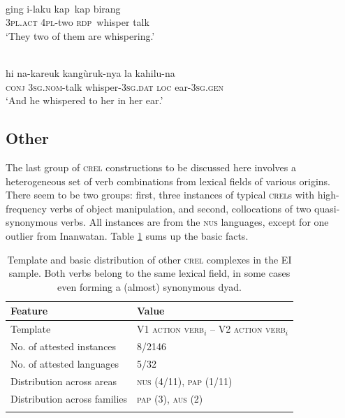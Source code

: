 \ea \label{WesternPantar030}
\\
\gll ging i-laku kap~kap birang \\
\textsc{3}\textsc{pl}.\textsc{act} \textsc{4}\textsc{pl}-two \textsc{rdp}~whisper talk \\
\glft `They two of them are whispering.'\\ 
\z

\ea \label{Kambera004}
\\
\gll hi na-kareuk kangùruk-nya la kahilu-na \\
\textsc{conj} \textsc{3}\textsc{sg}.\textsc{nom}-talk whisper-\textsc{3}\textsc{sg}.\textsc{dat} \textsc{loc} ear-\textsc{3}\textsc{sg}.\textsc{gen} \\
\glft `And he whispered to her in her ear.'\\ 
\z

\subsection{Other} \label{sec:other}
The last group of \textsc{crel} constructions to be discussed here involves a heterogeneous set of verb combinations from lexical fields of various origins. There seem to be two groups: first, three instances of typical \textsc{crel}s with high-frequency verbs of object manipulation, and second, collocations of two quasi-synonymous verbs. All instances are from the \textsc{nus} languages, except for one outlier from Inanwatan. Table \ref{table:basiccrelother} sums up the basic facts.

\begin{table}
\begin{tabular}{ll}
\lsptoprule
Feature&Value\tabularnewline
\midrule
Template&V1 \textsc{action verb}$_{i}$ -- V2 \textsc{action verb}$_{i}$\tabularnewline
No. of attested instances& 8/2146 \tabularnewline
No. of attested languages& 5/32 \tabularnewline
Distribution across areas& \textsc{nus} (4/11), \textsc{pap} (1/11) \tabularnewline
Distribution across families& \textsc{pap} (3), \textsc{aus} (2) \tabularnewline
\lspbottomrule
\end{tabular}
\caption[Template and basic distribution of other \textsc{crel} complexes]{Template and basic distribution of other \textsc{crel} complexes in the EI sample. Both verbs belong to the same lexical field, in some cases even forming a (almost) synonymous dyad.}
\label{table:basiccrelother}
\end{table}

